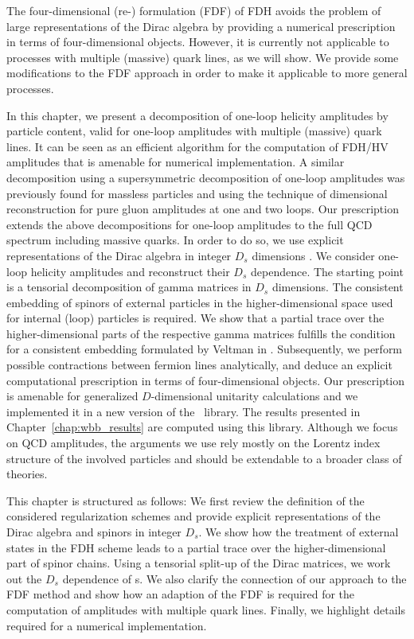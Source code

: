 The four-dimensional (re-)
formulation (FDF) \cite{Fazio:2014xea} of FDH avoids the
problem of large representations of the Dirac algebra by providing a numerical
prescription in terms of four-dimensional objects. However, it is
currently not applicable to processes with multiple (massive) quark
lines, as we will show. We provide some modifications to
the FDF approach in order to make it applicable to more general processes.

In this chapter, we present a decomposition of one-loop helicity
amplitudes by particle content, valid for one-loop amplitudes with
multiple (massive) quark lines. It can be seen as an efficient algorithm for the computation of FDH/HV amplitudes that is amenable for numerical implementation. A similar decomposition using a
supersymmetric decomposition of one-loop amplitudes was previously found for
massless particles \cite{Bern:1994cg,Bern:2002zk,Badger:2008cm} and using the technique of
dimensional reconstruction for pure gluon amplitudes
at one \cite{Giele:2008ve} and two \cite{Badger:2013gxa,Cheung:2009dc}
loops. Our prescription extends the above decompositions for one-loop amplitudes to the full QCD spectrum including massive quarks. In order to do so, we use explicit
representations of the Dirac algebra in integer $D_s$ dimensions \cite{Giele:2008ve}. We consider one-loop helicity amplitudes and
reconstruct their $D_s$ dependence. The starting point is a tensorial decomposition of gamma matrices in
$D_s$ dimensions. The consistent embedding of spinors of external
particles in the higher-dimensional
space used for internal (loop) particles is required. We show that a partial trace over the higher-dimensional parts of the
respective gamma matrices fulfills the condition for a consistent embedding formulated by Veltman in \cite{Veltman:1988au}. Subsequently, we perform possible contractions between fermion lines
analytically, and deduce an explicit computational
prescription in terms of four-dimensional objects. Our prescription
is amenable for generalized $D$-dimensional unitarity calculations and
we implemented it in a new version of the \BlackHat~library. The
results presented in Chapter~\ref{chap:wbb_results} are computed using this
library. Although we focus on QCD amplitudes, the
arguments we use rely mostly on the Lorentz
index structure of the involved particles and should be extendable to a broader class
of theories.

This chapter is structured as follows: We first review the definition of the considered regularization
schemes and provide explicit representations of the Dirac algebra
and spinors in
integer $D_s$. We show how the treatment of external states in the FDH
scheme leads to a partial trace over the higher-dimensional part of spinor
chains. Using a tensorial split-up of the Dirac matrices, we work out
the $D_s$ dependence
of \ola s. We also clarify the connection of our approach to
the FDF method and show how an adaption of the FDF is required for the computation of
amplitudes with multiple quark lines. Finally, we highlight details
required for a numerical implementation.

